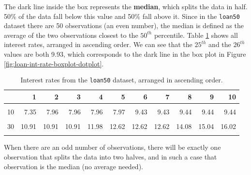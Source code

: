 \documentclass[
  10pt,
  openany]{book}
\begin{document}
The dark line inside the box represents the \textbf{median}, which splits the data in half.
50\% of the data fall below this value and 50\% fall above it.
Since in the \texttt{loan50} dataset there are 50 observations (an even number), the median is defined as the average of the two observations closest to the \(50^{th}\) percentile.
Table \ref{tab:loan50-int-rate-sorted} shows all interest rates, arranged in ascending order.
We can see that the \(25^{th}\) and the \(26^{th}\) values are both 9.93, which corresponds to the dark line in the box plot in Figure \ref{fig:loan-int-rate-boxplot-dotplot}.

\begin{table}[!h]

\caption{\label{tab:loan50-int-rate-sorted}Interest rates from the \texttt{loan50} dataset, arranged in ascending order.}
\centering
\begin{tabular}[t]{lrrrrrrrrrr}
\toprule
  & 1 & 2 & 3 & 4 & 5 & 6 & 7 & 8 & 9 & 10\\
\midrule
\cellcolor{gray!6}{1} & \cellcolor{gray!6}{5.31} & \cellcolor{gray!6}{5.31} & \cellcolor{gray!6}{5.32} & \cellcolor{gray!6}{6.08} & \cellcolor{gray!6}{6.08} & \cellcolor{gray!6}{6.08} & \cellcolor{gray!6}{6.71} & \cellcolor{gray!6}{6.71} & \cellcolor{gray!6}{7.34} & \cellcolor{gray!6}{7.35}\\
10 & 7.35 & 7.96 & 7.96 & 7.96 & 7.97 & 9.43 & 9.43 & 9.44 & 9.44 & 9.44\\
\cellcolor{gray!6}{20} & \cellcolor{gray!6}{9.92} & \cellcolor{gray!6}{9.92} & \cellcolor{gray!6}{9.92} & \cellcolor{gray!6}{9.92} & \cellcolor{gray!6}{9.93} & \cellcolor{gray!6}{9.93} & \cellcolor{gray!6}{10.42} & \cellcolor{gray!6}{10.42} & \cellcolor{gray!6}{10.90} & \cellcolor{gray!6}{10.90}\\
30 & 10.91 & 10.91 & 10.91 & 11.98 & 12.62 & 12.62 & 12.62 & 14.08 & 15.04 & 16.02\\
\cellcolor{gray!6}{40} & \cellcolor{gray!6}{17.09} & \cellcolor{gray!6}{17.09} & \cellcolor{gray!6}{17.09} & \cellcolor{gray!6}{18.06} & \cellcolor{gray!6}{18.45} & \cellcolor{gray!6}{19.42} & \cellcolor{gray!6}{20.00} & \cellcolor{gray!6}{21.45} & \cellcolor{gray!6}{24.85} & \cellcolor{gray!6}{26.30}\\
\bottomrule
\end{tabular}
\end{table}

When there are an odd number of observations, there will be exactly one observation that splits the data into two halves, and in such a case that observation is the median (no average needed).
\end{document}
